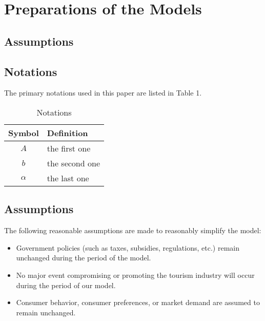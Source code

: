 \section{Preparations of the Models}

\subsection{Assumptions}

\subsection{Notations}

The primary notations used in this paper are listed in Table 1.

\begin{table}[!htbp]
  \begin{center}
  \caption{Notations}
  \begin{tabular}{cl}
    \toprule
    \multicolumn{1}{m{3cm}}{\centering Symbol}
    &\multicolumn{1}{m{8cm}}{\centering Definition}\\
    \midrule
    $A$&the first one\\
    $b$&the second one\\
    $\alpha$ &the last one\\
    \bottomrule
  \end{tabular}
  \end{center}
  \end{table}

\subsection{Assumptions}

The following reasonable assumptions are made to reasonably simplify the model:

\begin{itemize}
  \item Government policies (such as taxes, subsidies, regulations, etc.) remain unchanged during the period of the model.
  \item No major event compromising or promoting the tourism industry will occur during the period of our model.
  \item Consumer behavior, consumer preferences, or market demand are assumed to remain unchanged.
\end{itemize}
